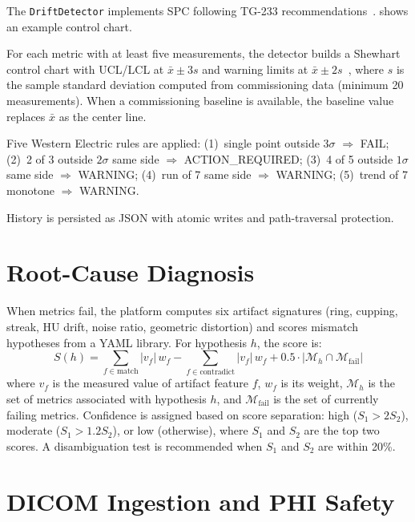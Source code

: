 \documentclass[11pt]{article}
\begin{document}
The \texttt{DriftDetector} implements SPC following TG-233
recommendations~\cite{aapm_tg233,pawlicki2005spc}.
 shows an example control chart.

For each metric with at least five measurements, the detector
builds a Shewhart control chart with UCL/LCL at $\bar{x} \pm 3s$
and warning limits at $\bar{x} \pm 2s$~\cite{shewhart1931,western_electric_1956},
where $s$ is the sample standard deviation computed from commissioning
data (minimum 20 measurements).
When a commissioning baseline is available, the baseline value
replaces $\bar{x}$ as the center line.

Five Western Electric rules are applied:
(1)~single point outside $3\sigma$ $\Rightarrow$ FAIL;
(2)~2 of 3 outside $2\sigma$ same side $\Rightarrow$ ACTION\_REQUIRED;
(3)~4 of 5 outside $1\sigma$ same side $\Rightarrow$ WARNING;
(4)~run of 7 same side $\Rightarrow$ WARNING;
(5)~trend of 7 monotone $\Rightarrow$ WARNING.

History is persisted as JSON with atomic writes and path-traversal
protection.


\section{Root-Cause Diagnosis}
\label{sec:diagnosis}

When metrics fail, the platform computes six artifact signatures
(ring, cupping, streak, HU drift, noise ratio, geometric distortion)
and scores mismatch hypotheses from a YAML library.
For hypothesis $h$, the score is:
\begin{equation}
  S(h) = \sum_{f \in \text{match}} |v_f|\, w_f
  - \sum_{f \in \text{contradict}} |v_f|\, w_f
  + 0.5 \cdot |\mathcal{M}_h \cap \mathcal{M}_{\text{fail}}|
  \label{eq:score}
\end{equation}
where $v_f$ is the measured value of artifact feature $f$, $w_f$ is
its weight, $\mathcal{M}_h$ is the set of metrics associated with
hypothesis $h$, and $\mathcal{M}_{\text{fail}}$ is the set of
currently failing metrics.
Confidence is assigned based on score separation:
high ($S_1 > 2 S_2$), moderate ($S_1 > 1.2 S_2$), or low (otherwise),
where $S_1$ and $S_2$ are the top two scores.
A disambiguation test is recommended when $S_1$ and $S_2$ are within 20\%.


\section{DICOM Ingestion and PHI Safety}
\label{sec:dicom}
\end{document}
